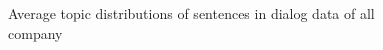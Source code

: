 \documentclass[10pt, conference, compsocconf]{IEEEtran}
\begin{document}
\begin{figure}[t]
\caption{Average topic distributions of sentences in dialog data of all company}
\label{fig_c}
\end{figure}
\end{document}
